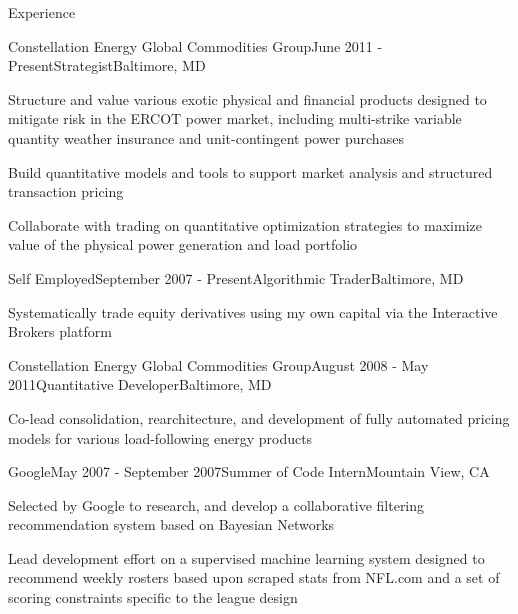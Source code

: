 \documentclass{resume} %
\begin{document}
\begin{rSection}{Experience}

\begin{rSubsection}{Constellation Energy Global Commodities Group}{June 2011 - Present}{Strategist}{Baltimore, MD}
\item Structure and value various exotic physical and financial  products designed to mitigate risk in the ERCOT power market, including multi-strike variable quantity weather insurance and unit-contingent power purchases
\item Build quantitative models and tools to support market analysis and structured transaction pricing
\item Collaborate with trading on quantitative optimization strategies to maximize value of the physical power generation and load portfolio
\end{rSubsection}


\begin{rSubsection}{Self Employed}{September 2007 - Present}{Algorithmic Trader}{Baltimore, MD}
\item Systematically trade equity derivatives using my own capital via the Interactive Brokers platform

\end{rSubsection}


\begin{rSubsection}{Constellation Energy Global Commodities Group}{August 2008 - May 2011}{Quantitative Developer}{Baltimore, MD}
\item Co-lead consolidation, rearchitecture, and development of fully automated pricing models for various load-following energy products
\end{rSubsection}

\begin{rSubsection}{Google}{May 2007 - September 2007}{Summer of Code Intern}{Mountain View, CA}
\item Selected by Google to research, and develop a collaborative filtering recommendation system based on Bayesian Networks
\item Lead development effort on a supervised machine learning system designed to recommend weekly rosters based upon scraped stats from NFL.com and a set of scoring constraints specific to the league design
\end{rSubsection}

\end{rSection}
\end{document}

